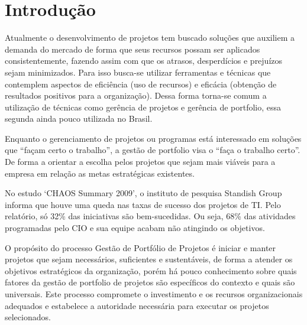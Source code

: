 \documentclass[12pt,a4paper,ruledheader,tocpage=prefix,floatnumber=continuous,pagestart=folhaderosto,font=times]{abnt}
\begin{document}















\listadefiguras
\cleardoublepage 
\listadetabelas
\cleardoublepage



\tableofcontents

\chapter{Introdução}
Atualmente o desenvolvimento de projetos tem buscado soluções que auxiliem a demanda do mercado de forma que seus recursos possam ser aplicados
consistentemente, fazendo assim com que os atrasos, desperdícios e prejuízos sejam minimizados. Para isso busca-se utilizar ferramentas e 
técnicas que contemplem aspectos de eficiência (uso de recursos) e eficácia (obtenção de resultados positivos para a organização).
Dessa forma torna-se comum a utilização de técnicas como gerência de projetos e gerência de portfolio, essa segunda ainda pouco utilizada no Brasil.

Enquanto o gerenciamento de projetos ou programas está interessado em soluções que ``façam certo o trabalho'', a gestão de portfolio visa o ``faça o 
trabalho certo''.\cite{sppm} De forma a orientar a escolha pelos projetos que sejam mais viáveis para a empresa em relação as metas estratégicas 
existentes. 

No estudo ‘CHAOS Summary 2009’, o instituto de pesquisa Standish Group informa que houve uma queda nas taxas de sucesso dos projetos de TI. Pelo 
relatório, só 32\% das iniciativas são bem-sucedidas. Ou seja, 68\% das atividades programadas pelo CIO e sua equipe acabam não atingindo os objetivos.

O propósito do processo Gestão de Portfólio de Projetos é iniciar e manter projetos que sejam necessários, suficientes e sustentáveis, de forma a 
atender os objetivos estratégicos da organização, porém há pouco conhecimento sobre quais fatores da gestão de portfolio de projetos são específicos do 
contexto e quais são universais. Este processo compromete o investimento e os recursos organizacionais adequados e estabelece a autoridade necessária 
para executar os projetos selecionados.\cite{mps}
\end{document}
